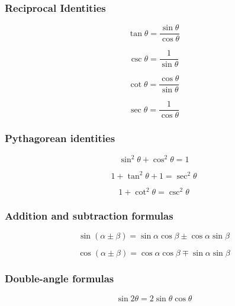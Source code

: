 \documentclass{book}
\begin{document}
\subsubsection{Reciprocal Identities}

\begin{equation}
	\tan \theta = \frac{\sin\theta}{\cos \theta}
\end{equation}

\begin{equation} 
	\csc \theta = \frac{1}{\sin \theta}
\end{equation}

\begin{equation} 
	\cot \theta = \frac{\cos \theta}{\sin \theta}
\end{equation}

\begin{equation} 
	\sec \theta = \frac{1}{\cos \theta}
\end{equation}

\subsubsection{Pythagorean identities}

\begin{equation}
	\sin^2 \theta + \cos^2 \theta = 1
\end{equation}

\begin{equation}
	1 + \tan^2 \theta + 1 = \sec^2 \theta
\end{equation}

\begin{equation}
	1 + \cot^2 \theta = \csc^2 \theta
\end{equation}

\subsubsection{Addition and subtraction formulas}
\begin{equation} 
	\sin(\alpha \pm \beta) = \sin \alpha \cos \beta \pm \cos \alpha \sin \beta
\end{equation}

\begin{equation} 
	\cos(\alpha \pm \beta) = \cos \alpha \cos \beta \mp \sin \alpha \sin \beta
\end{equation}

\subsubsection{Double-angle formulas}
\begin{equation}
	\sin 2\theta = 2 \sin \theta \cos \theta
\end{equation}
\end{document}
